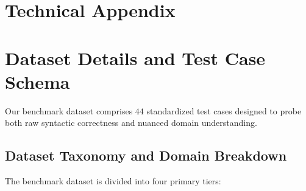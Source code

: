 \documentclass{article}
\begin{document}
{
\small






}



\newpage
\appendix

\section*{Technical Appendix}
\section{Dataset Details and Test Case Schema}
\label{sec:dataset_details}

 Our benchmark dataset comprises $44$ standardized test cases designed to probe both raw syntactic correctness and nuanced domain understanding.

\subsection{Dataset Taxonomy and Domain Breakdown}
The benchmark dataset is divided into four primary tiers:
\end{document}
